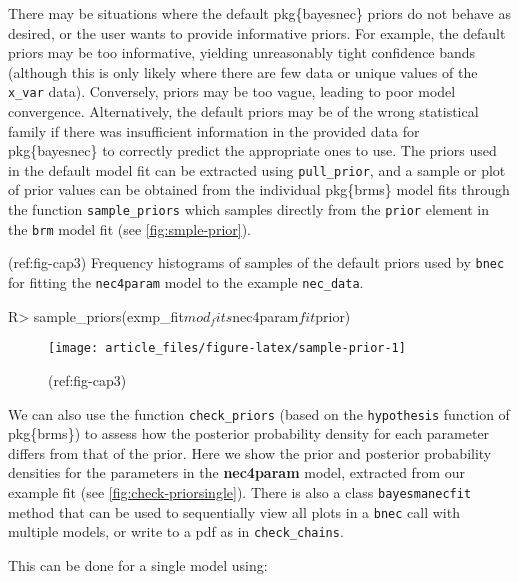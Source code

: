 \documentclass[
]{jss}
\begin{document}
There may be situations where the default pkg\{bayesnec\} priors do not
behave as desired, or the user wants to provide informative priors. For
example, the default priors may be too informative, yielding
unreasonably tight confidence bands (although this is only likely where
there are few data or unique values of the \texttt{x\_var} data).
Conversely, priors may be too vague, leading to poor model convergence.
Alternatively, the default priors may be of the wrong statistical family
if there was insufficient information in the provided data for
pkg\{bayesnec\} to correctly predict the appropriate ones to use. The
priors used in the default model fit can be extracted using
\texttt{pull\_prior}, and a sample or plot of prior values can be
obtained from the individual pkg\{brms\} model fits through the function
\texttt{sample\_priors} which samples directly from the \texttt{prior}
element in the \texttt{brm} model fit (see \autoref{fig:smple-prior}).

(ref:fig-cap3) Frequency histograms of samples of the default priors
used by \texttt{bnec} for fitting the \texttt{nec4param} model to the
example \texttt{nec\_data}.

\begin{CodeChunk}
\begin{CodeInput}
R> sample_priors(exmp_fit$mod_fits$nec4param$fit$prior)
\end{CodeInput}
\begin{figure}

{\centering \texttt{[image: article\_files/figure-latex/sample-prior-1]} 

}

\caption[(ref:fig-cap3)]{(ref:fig-cap3)}\label{fig:sample-prior}
\end{figure}
\end{CodeChunk}

We can also use the function \texttt{check\_priors} (based on the
\texttt{hypothesis} function of pkg\{brms\}) to assess how the posterior
probability density for each parameter differs from that of the prior.
Here we show the prior and posterior probability densities for the
parameters in the \textbf{nec4param} model, extracted from our example
fit (see \autoref{fig:check-priorsingle}). There is also a class
\texttt{bayesmanecfit} method that can be used to sequentially view all
plots in a \texttt{bnec} call with multiple models, or write to a pdf as
in \texttt{check\_chains}.

This can be done for a single model using:
\end{document}

